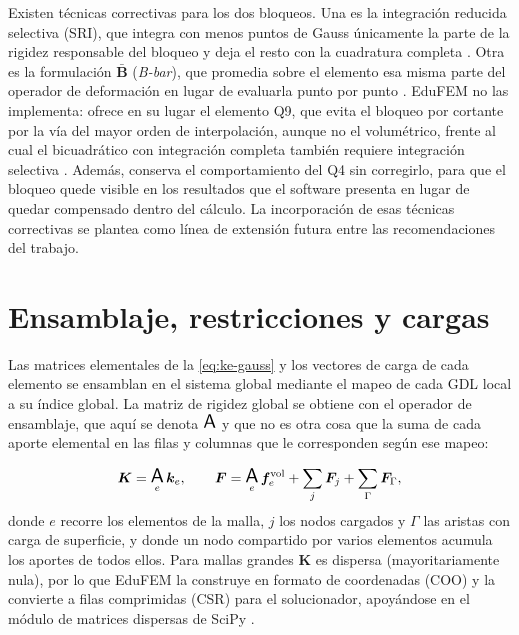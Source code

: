 Existen técnicas correctivas para los dos bloqueos. Una es la integración reducida selectiva (SRI), que integra con menos puntos de Gauss únicamente la parte de la rigidez responsable del bloqueo y deja el resto con la cuadratura completa \autocites[p.~221]{hughes2000fem}[pp.~476-477]{bathe2014fem}. Otra es la formulación $\bar{\bm{B}}$ (\emph{B-bar}), que promedia sobre el elemento esa misma parte del operador de deformación en lugar de evaluarla punto por punto \autocite[pp.~232-234]{hughes2000fem}. EduFEM no las implementa: ofrece en su lugar el elemento Q9, que evita el bloqueo por cortante por la vía del mayor orden de interpolación, aunque no el volumétrico, frente al cual el bicuadrático con integración completa también requiere integración selectiva \autocite[p.~222]{hughes2000fem}. Además, conserva el comportamiento del Q4 sin corregirlo, para que el bloqueo quede visible en los resultados que el software presenta en lugar de quedar compensado dentro del cálculo. La incorporación de esas técnicas correctivas se plantea como línea de extensión futura entre las recomendaciones del trabajo.

\section{Ensamblaje, restricciones y cargas}
\label{sec:ensamblaje}

Las matrices elementales de la \autoref{eq:ke-gauss} y los vectores de carga de cada elemento se ensamblan en el sistema global mediante el mapeo de cada GDL local a su índice global. La matriz de rigidez global se obtiene con el operador de ensamblaje, que aquí se denota $\operatorname*{\text{\Large\textsf{A}}}$ y que no es otra cosa que la suma de cada aporte elemental en las filas y columnas que le corresponden según ese mapeo:

\begin{equation}
\bm{K} = \operatorname*{\text{\Large\textsf{A}}}_{e} \bm{k}_e, \qquad
\bm{F} = \operatorname*{\text{\Large\textsf{A}}}_{e} \bm{f}_e^{\text{vol}} + \sum_j \bm{F}_j + \sum_\Gamma \bm{F}_\Gamma,
\label{eq:ensamblaje}
\end{equation}
donde $e$ recorre los elementos de la malla, $j$ los nodos cargados y $\Gamma$ las aristas con carga de superficie, y donde un nodo compartido por varios elementos acumula los aportes de todos ellos. Para mallas grandes $\bm{K}$ es dispersa (mayoritariamente nula), por lo que EduFEM la construye en formato de coordenadas (COO) y la convierte a filas comprimidas (CSR) para el solucionador, apoyándose en el módulo de matrices dispersas de SciPy \autocite[p.~265]{virtanen2020scipy}.

